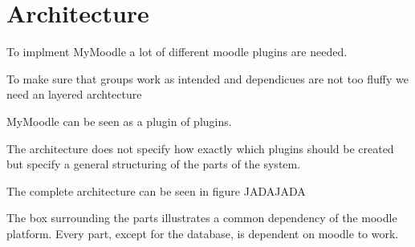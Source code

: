 \section{Architecture}
To implment MyMoodle a lot of different moodle plugins are needed. 

To make sure that groups work as intended and dependicues are not too fluffy we need an layered archtecture


MyMoodle can be seen as a plugin of plugins. 

The architecture does not specify how exactly which plugins should be created but specify a general structuring of the parts of the system. 

The complete architecture can be seen in figure JADAJADA

The box surrounding the parts illustrates a common dependency of the moodle platform. 
Every part, except for the database, is dependent on moodle to work. 



















